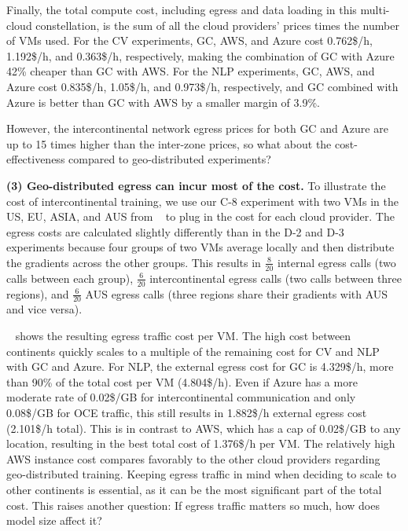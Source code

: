 Finally, the total compute cost, including egress and data loading in this multi-cloud constellation, is the sum of all the cloud providers' prices times the number of VMs used.
For the CV experiments, GC, AWS, and Azure cost 0.762\$/h, 1.192\$/h, and 0.363\$/h, respectively, making the combination of GC with Azure 42\% cheaper than GC with AWS.
For the NLP experiments, GC, AWS, and Azure cost 0.835\$/h, 1.05\$/h, and 0.973\$/h, respectively, and GC combined with Azure is better than GC with AWS by a smaller margin of 3.9\%.

However, the intercontinental network egress prices for both GC and Azure are up to 15 times higher than the inter-zone prices, so what about the cost-effectiveness compared to geo-distributed experiments?


\textbf{(3) Geo-distributed egress can incur most of the cost.} To illustrate the cost of intercontinental training, we use our C-8 experiment with two VMs in the US, EU, ASIA, and AUS from ~ to plug in the cost for each cloud provider.
The egress costs are calculated slightly differently than in the D-2 and D-3 experiments because four groups of two VMs average locally and then distribute the gradients across the other groups.
This results in $\frac{8}{20}$ internal egress calls (two calls between each group), $\frac{6}{20}$ intercontinental egress calls (two calls between three regions), and $\frac{6}{20}$ AUS egress calls (three regions share their gradients with AUS and vice versa).

~ shows the resulting egress traffic cost per VM.
The high cost between continents quickly scales to a multiple of the remaining cost for CV and NLP with GC and Azure.
For NLP, the external egress cost for GC is 4.329\$/h, more than 90\% of the total cost per VM (4.804\$/h).
Even if Azure has a more moderate rate of 0.02\$/GB for intercontinental communication and only 0.08\$/GB for OCE traffic, this still results in 1.882\$/h external egress cost (2.101\$/h total).
This is in contrast to AWS, which has a cap of 0.02\$/GB to any location, resulting in the best total cost of 1.376\$/h per VM.
The relatively high AWS instance cost compares favorably to the other cloud providers regarding geo-distributed training.
Keeping egress traffic in mind when deciding to scale to other continents is essential, as it can be the most significant part of the total cost.
This raises another question: If egress traffic matters so much, how does model size affect it?

